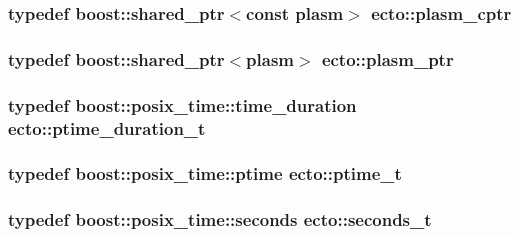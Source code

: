 \subsubsection[{plasm\+\_\+cptr}]{\setlength{\rightskip}{0pt plus 5cm}typedef boost\+::shared\+\_\+ptr$<$const {\bf plasm}$>$ {\bf ecto\+::plasm\+\_\+cptr}}\label{namespaceecto_a5a9973f00c94e30353acb27c3d2fa836}
\hypertarget{namespaceecto_a6b83be6cd685db71f03b14871653475f}{}
\subsubsection[{plasm\+\_\+ptr}]{\setlength{\rightskip}{0pt plus 5cm}typedef boost\+::shared\+\_\+ptr$<${\bf plasm}$>$ {\bf ecto\+::plasm\+\_\+ptr}}\label{namespaceecto_a6b83be6cd685db71f03b14871653475f}
\hypertarget{namespaceecto_a0952d5ebd059cbd79b978ecab9ec781c}{}
\subsubsection[{ptime\+\_\+duration\+\_\+t}]{\setlength{\rightskip}{0pt plus 5cm}typedef boost\+::posix\+\_\+time\+::time\+\_\+duration {\bf ecto\+::ptime\+\_\+duration\+\_\+t}}\label{namespaceecto_a0952d5ebd059cbd79b978ecab9ec781c}
\hypertarget{namespaceecto_a5bbe8fb0da047cb18d92eb9dfb469652}{}
\subsubsection[{ptime\+\_\+t}]{\setlength{\rightskip}{0pt plus 5cm}typedef boost\+::posix\+\_\+time\+::ptime {\bf ecto\+::ptime\+\_\+t}}\label{namespaceecto_a5bbe8fb0da047cb18d92eb9dfb469652}
\hypertarget{namespaceecto_ae14f91b3661ad9cb774590b15407742c}{}
\subsubsection[{seconds\+\_\+t}]{\setlength{\rightskip}{0pt plus 5cm}typedef boost\+::posix\+\_\+time\+::seconds {\bf ecto\+::seconds\+\_\+t}}\label{namespaceecto_ae14f91b3661ad9cb774590b15407742c}
\hypertarget{namespaceecto_a96ba8fa498cc4b8e2a0217a9e236b50d}{}

